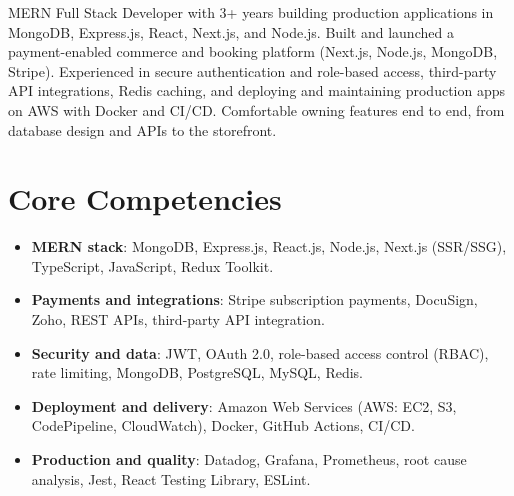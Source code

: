 \documentclass[11pt,a4paper,sans]{moderncv}
\begin{document}
\makecvtitle


\vspace{6pt}
{\small MERN Full Stack Developer with 3+ years building production applications in MongoDB, Express.js, React, Next.js, and Node.js. Built and launched a payment-enabled commerce and booking platform (Next.js, Node.js, MongoDB, Stripe). Experienced in secure authentication and role-based access, third-party API integrations, Redis caching, and deploying and maintaining production apps on AWS with Docker and CI/CD. Comfortable owning features end to end, from database design and APIs to the storefront.\par}


\section{Core Competencies}
\vspace{1pt}
\begin{itemize}

\item \textbf{MERN stack}: MongoDB, Express.js, React.js, Node.js, Next.js (SSR/SSG), TypeScript, JavaScript, Redux Toolkit.

\item \textbf{Payments and integrations}: Stripe subscription payments, DocuSign, Zoho, REST APIs, third-party API integration.

\item \textbf{Security and data}: JWT, OAuth 2.0, role-based access control (RBAC), rate limiting, MongoDB, PostgreSQL, MySQL, Redis.

\item \textbf{Deployment and delivery}: Amazon Web Services (AWS: EC2, S3, CodePipeline, CloudWatch), Docker, GitHub Actions, CI/CD.

\item \textbf{Production and quality}: Datadog, Grafana, Prometheus, root cause analysis, Jest, React Testing Library, ESLint.

\end{itemize}

\end{document}
